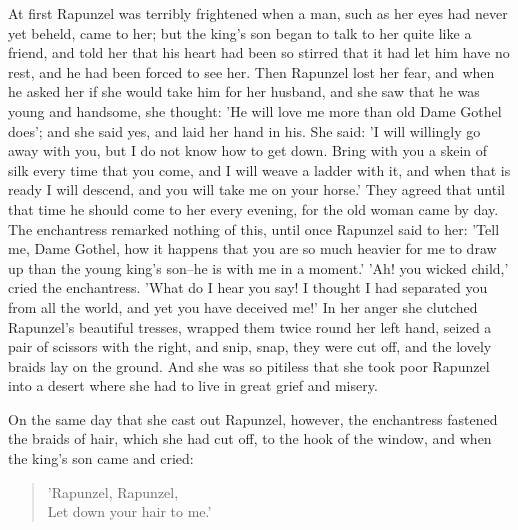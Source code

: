 \documentclass[12pt]{book}
\begin{document}
At first Rapunzel was terribly frightened when a man, such as her eyes
had never yet beheld, came to her; but the king's son began to talk to
her quite like a friend, and told her that his heart had been so
stirred that it had let him have no rest, and he had been forced to
see her. Then Rapunzel lost her fear, and when he asked her if she
would take him for her husband, and she saw that he was young and
handsome, she thought: 'He will love me more than old Dame Gothel
does'; and she said yes, and laid her hand in his. She said: 'I will
willingly go away with you, but I do not know how to get down. Bring
with you a skein of silk every time that you come, and I will weave a
ladder with it, and when that is ready I will descend, and you will
take me on your horse.' They agreed that until that time he should
come to her every evening, for the old woman came by day. The
enchantress remarked nothing of this, until once Rapunzel said to her:
'Tell me, Dame Gothel, how it happens that you are so much heavier for
me to draw up than the young king's son--he is with me in a moment.'
'Ah! you wicked child,' cried the enchantress. 'What do I hear you
say! I thought I had separated you from all the world, and yet you
have deceived me!' In her anger she clutched Rapunzel's beautiful
tresses, wrapped them twice round her left hand, seized a pair of
scissors with the right, and snip, snap, they were cut off, and the
lovely braids lay on the ground. And she was so pitiless that she took
poor Rapunzel into a desert where she had to live in great grief and
misery.

On the same day that she cast out Rapunzel, however, the enchantress
fastened the braids of hair, which she had cut off, to the hook of the
window, and when the king's son came and cried:

\begin{verse}
 'Rapunzel, Rapunzel,\\
  Let down your hair to me.'
\end{verse}
\end{document}
